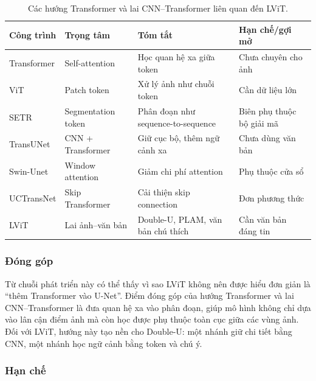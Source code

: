 \begin{table}[!t]
  \centering
  \caption{Các hướng Transformer và lai CNN--Transformer liên quan đến LViT.}
  \label{tab:transformer-related-works}
  \scriptsize
  \renewcommand{\arraystretch}{1.15}
  \setlength{\tabcolsep}{5pt}
  \begin{tabularx}{\textwidth}{@{}l L L L@{}}
    \toprule
    Công trình & Trọng tâm & Tóm tắt & Hạn chế/gợi mở \\
    \midrule
    Transformer \cite{vaswani2017attention} & Self-attention & Học quan hệ xa giữa token & Chưa chuyên cho ảnh \\
    ViT \cite{dosovitskiy2020vit} & Patch token & Xử lý ảnh như chuỗi token & Cần dữ liệu lớn \\
    SETR \cite{zheng2021setr} & Segmentation token & Phân đoạn như sequence-to-sequence & Biên phụ thuộc bộ giải mã \\
    TransUNet \cite{chen2021transunet} & CNN + Transformer & Giữ cục bộ, thêm ngữ cảnh xa & Chưa dùng văn bản \\
    Swin-Unet \cite{cao2021swinunet} & Window attention & Giảm chi phí attention & Phụ thuộc cửa sổ \\
    UCTransNet \cite{wang2021uctransnet} & Skip Transformer & Cải thiện skip connection & Đơn phương thức \\
    LViT \cite{li2023lvit} & Lai ảnh--văn bản & Double-U, PLAM, văn bản chú thích & Cần văn bản đáng tin \\
    \bottomrule
  \end{tabularx}
\end{table}
\FloatBarrier

\subsubsection{Đóng góp}

Từ chuỗi phát triển này có thể thấy vì sao LViT không nên được hiểu đơn giản là ``thêm Transformer vào U-Net''. Điểm đóng góp của hướng Transformer và lai CNN--Transformer là đưa quan hệ xa vào phân đoạn, giúp mô hình không chỉ dựa vào lân cận điểm ảnh mà còn học được phụ thuộc toàn cục giữa các vùng ảnh. Đối với LViT, hướng này tạo nền cho Double-U: một nhánh giữ chi tiết bằng CNN, một nhánh học ngữ cảnh bằng token và chú ý.

\subsubsection{Hạn chế}

